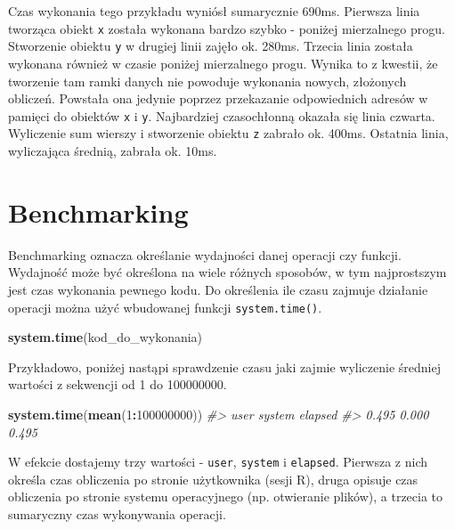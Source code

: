 \documentclass[paper=6in:9in,pagesize=pdftex,headinclude=on,footinclude=on,10pt]{scrbook}
\newenvironment{Shaded}{\begin{snugshade}}{\end{snugshade}}
\newcommand{\CommentTok}[1]{\textcolor[rgb]{0.56,0.35,0.01}{\textit{#1}}}
\newcommand{\DecValTok}[1]{\textcolor[rgb]{0.00,0.00,0.81}{#1}}
\newcommand{\KeywordTok}[1]{\textcolor[rgb]{0.13,0.29,0.53}{\textbf{#1}}}
\newcommand{\NormalTok}[1]{#1}
\newcommand{\OperatorTok}[1]{\textcolor[rgb]{0.81,0.36,0.00}{\textbf{#1}}}
\begin{document}
Czas wykonania tego przykładu wyniósł sumarycznie 690ms.
Pierwsza linia tworząca obiekt \texttt{x} została wykonana bardzo szybko - poniżej mierzalnego progu.
Stworzenie obiektu \texttt{y} w drugiej linii zajęło ok. 280ms.
Trzecia linia została wykonana również w czasie poniżej mierzalnego progu.
Wynika to z kwestii, że tworzenie tam ramki danych nie powoduje wykonania nowych, złożonych obliczeń.
Powstała ona jedynie poprzez przekazanie odpowiednich adresów w pamięci do obiektów \texttt{x} i \texttt{y}.
Najbardziej czasochłonną okazała się linia czwarta.
Wyliczenie sum wierszy i stworzenie obiektu \texttt{z} zabrało ok. 400ms.
Ostatnia linia, wyliczająca średnią, zabrała ok. 10ms.

\hypertarget{benchmarking}{%
\section{Benchmarking}\label{benchmarking}}

Benchmarking oznacza określanie wydajności danej operacji czy funkcji.
Wydajność może być określona na wiele różnych sposobów, w tym najprostszym jest czas wykonania pewnego kodu.
Do określenia ile czasu zajmuje działanie operacji można użyć wbudowanej funkcji \texttt{system.time()}.

\begin{Shaded}
\begin{Highlighting}[]
\KeywordTok{system.time}\NormalTok{(kod_do_wykonania)}
\end{Highlighting}
\end{Shaded}

Przykładowo, poniżej nastąpi sprawdzenie czasu jaki zajmie wyliczenie średniej wartości z sekwencji od 1 do 100000000.

\begin{Shaded}
\begin{Highlighting}[]
\KeywordTok{system.time}\NormalTok{(}\KeywordTok{mean}\NormalTok{(}\DecValTok{1}\OperatorTok{:}\DecValTok{100000000}\NormalTok{))}
\CommentTok{#>    user  system elapsed }
\CommentTok{#>   0.495   0.000   0.495}
\end{Highlighting}
\end{Shaded}

W efekcie dostajemy trzy wartości - \texttt{user}, \texttt{system} i \texttt{elapsed}. Pierwsza z nich określa czas obliczenia po stronie użytkownika (sesji R), druga opisuje czas obliczenia po stronie systemu operacyjnego (np. otwieranie plików), a trzecia to sumaryczny czas wykonywania operacji.
\end{document}
